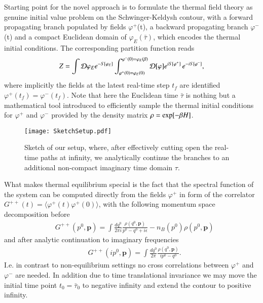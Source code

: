 \documentclass[epj]{webofc}
\begin{document}
Starting point for the novel approach is to formulate the thermal field theory as genuine initial value problem on the Schwinger-Keldysh contour, with a forward propagating branch populated by fields $\varphi^+$(t), a backward propagating branch $\varphi^-$(t) and a compact Euclidean domain of $\varphi_E(\bar{\tau})$, which encodes the thermal initial conditions. The corresponding partition function reads
\begin{align}
Z=\int {\cal D}\varphi_Ee^{-S[\varphi_E]}\int_{\varphi^+(0)=\varphi_E(0)}^{\varphi^-(0)=\varphi_E(\beta)} {\cal D} [\varphi] e^{iS[\varphi^+]}\,e^{-iS[\varphi^-]},
\end{align}
where implicitly the fields at the latest real-time step $t_f$ are identified $\varphi^+(t_f)=\varphi^-(t_f)$. Note that here the Euclidean time $\bar{\tau}$ is nothing but a mathematical tool introduced to efficiently sample the thermal initial conditions for $\varphi^+$ and $\varphi^-$ provided by the density matrix $\rho={\rm exp}[-\beta H]$. \begin{wrapfigure}{r}{0.45\textwidth}
  \begin{center}\vspace{-0.65cm}
  \hspace{-0.5cm}\texttt{[image: SketchSetup.pdf]}
  \end{center}\vspace{-0.5cm}
 \caption{Sketch of our setup, where, after effectively cutting open the real-time paths at infinity, we analytically continue the branches to an additional non-compact imaginary time domain $\tau$.}\label{Fig:Setup}\vspace{-1.75cm}
\end{wrapfigure}
What makes thermal equilibrium special is the fact that the spectral function of the system can be computed directly from the fields $\varphi^+$ in form of the correlator $G^{++}(t)=\langle \varphi^+(t)\varphi^+(0)\rangle$, with the following momentum space decomposition before 
\begin{align}
\nonumber&G^{++}(p^0,{\mathbf p}) = \int \frac{dq^0}{2\pi i} \frac{\rho(q^0,{\mathbf p})}{p^0-q^0+i\epsilon}-n_B(p^0)\rho(p^0,{\mathbf p})
\end{align}
and after analytic continuation to imaginary frequencies
\begin{align}
&G^{++}(ip^0,{\mathbf p})= \int \frac{dq^0}{2\pi} \frac{\rho(q^0,{\mathbf p})}{ip^0-q^0}.
\end{align} 
I.e. in contrast to non-equilibrium settings no cross correlations between $\varphi^+$ and $\varphi^-$ are needed. In addition due to time translational invariance we may move the initial time point $t_0=\bar{\tau}_0$ to negative infinity and extend the contour to positive infinity. 
\end{document}
